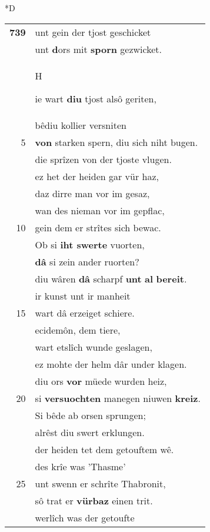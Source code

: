 \documentclass[8pt,a4paper,notitlepage]{article}
\begin{document}
\begin{table}[ht]
\begin{minipage}[t]{0.5\linewidth}
\small
\begin{center}*D
\end{center}
\begin{tabular}{rl}
\textbf{739} & unt gein der tjost geschicket\\ 
 & unt \textbf{d}ors mit \textbf{sporn} gezwicket.\\ 
 & \begin{large}H\end{large}ie wart \textbf{diu} tjost alsô geriten,\\ 
 & bêdiu kollier versniten\\ 
5 & \textbf{von} starken spern, diu sich niht bugen.\\ 
 & die sprîzen von der tjoste vlugen.\\ 
 & ez het der heiden gar vür haz,\\ 
 & daz dirre man vor im gesaz,\\ 
 & wan des nieman vor im gepflac,\\ 
10 & gein dem er strîtes sich bewac.\\ 
 & Ob si \textbf{iht swerte} vuorten,\\ 
 & \textbf{dâ} si zein ander ruorten?\\ 
 & diu wâren \textbf{dâ} scharpf \textbf{unt} \textbf{al} \textbf{bereit}.\\ 
 & ir kunst unt ir manheit\\ 
15 & wart dâ erzeiget schiere.\\ 
 & ecidemôn, dem tiere,\\ 
 & wart etslîch wunde geslagen,\\ 
 & ez mohte der helm dâr under klagen.\\ 
 & diu ors \textbf{vor} müede wurden heiz,\\ 
20 & si \textbf{versuochten} manegen niuwen \textbf{kreiz}.\\ 
 & Si bêde ab orsen sprungen;\\ 
 & alrêst diu swert erklungen.\\ 
 & der heiden tet dem getouftem wê.\\ 
 & des krîe was 'Thasme'\\ 
25 & unt swenn er schrîte Thabronit,\\ 
 & sô trat er \textbf{vürbaz} einen trit.\\ 
 & werlîch was der getoufte\\ 

\end{tabular}
\end{minipage}
\end{table}
\end{document}
